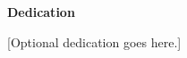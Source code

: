 
\begin{center}
\vspace*{5\baselineskip}
\textbf{\large Dedication}
\end{center}

\begin{flushleft}
\hspace{10mm}[Optional dedication goes here.]
\end{flushleft}
